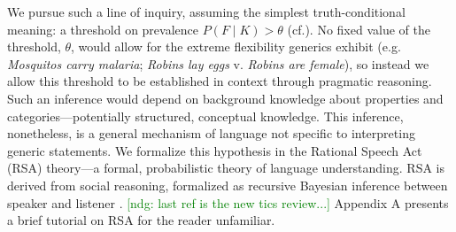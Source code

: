 \documentclass[12pt,letterpaper]{article}
\newcommand{\ndg}[1]{\textcolor{Green}{[ndg: #1]}}
\begin{document}
We pursue such a line of inquiry, assuming the simplest truth-conditional meaning: a threshold on prevalence $P(F\mid K)>\theta$ (cf.).
No fixed value of the threshold, $\theta$, would allow for the extreme flexibility generics exhibit (e.g. \emph{Mosquitos carry malaria}; \emph{Robins lay eggs} v. \emph{Robins are female}), %
so instead we allow this threshold to be established in context through pragmatic reasoning. %
Such an inference would depend on background knowledge about properties and categories---potentially structured, conceptual knowledge.
This inference, nonetheless, is a general mechanism of language not specific to interpreting generic statements.
We formalize this hypothesis in the Rational Speech Act (RSA) theory---a formal, probabilistic theory of language understanding.
RSA is derived from social reasoning, formalized as recursive Bayesian inference between speaker and listener \cite{Frank2012,Goodman2013,Goodman2016}. \ndg{last ref is the new tics review...}
Appendix A presents a brief tutorial on RSA for the reader unfamiliar.

\end{document}
